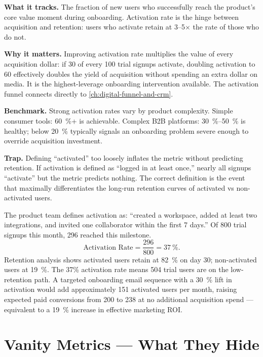 \textbf{What it tracks.} The fraction of new users who successfully reach the product's core
value moment during onboarding. Activation rate is the hinge between acquisition and
retention: users who activate retain at 3--5$\times$ the rate of those who do not.

\textbf{Why it matters.} Improving activation rate multiplies the value of every acquisition
dollar: if 30 of every 100 trial signups activate, doubling activation to 60 effectively
doubles the yield of acquisition without spending an extra dollar on media. It is the
highest-leverage onboarding intervention available. The activation funnel connects directly
to \cref{ch:digital-funnel-and-crm}.

\textbf{Benchmark.} Strong activation rates vary by product complexity. Simple consumer
tools: \qty{60}{\percent}+ is achievable. Complex B2B platforms: \qty{30}{\percent}--\qty{50}{\percent}
is healthy; below \qty{20}{\percent} typically signals an onboarding problem severe enough
to override acquisition investment.

\textbf{Trap.} Defining ``activated'' too loosely inflates the metric without predicting
retention. If activation is defined as ``logged in at least once,'' nearly all signups
``activate'' but the metric predicts nothing. The correct definition is the event that
maximally differentiates the long-run retention curves of activated vs non-activated users.

\begin{example}
The product team defines activation as: ``created a workspace, added at least two
integrations, and invited one collaborator within the first 7 days.'' Of \num{800} trial
signups this month, \num{296} reached this milestone.
\[
  \text{Activation Rate} = \frac{296}{800} = \qty{37}{\percent}.
\]
Retention analysis shows activated users retain at \qty{82}{\percent} on day 30; non-activated
users at \qty{19}{\percent}. The 37\% activation rate means 504 trial users are on the
low-retention path. A targeted onboarding email sequence with a \qty{30}{\percent} lift in
activation would add approximately 151 activated users per month, raising expected paid
conversions from 200 to 238 at no additional acquisition spend --- equivalent to a
\qty{19}{\percent} increase in effective marketing ROI.
\end{example}


\section{Vanity Metrics --- What They Hide}

